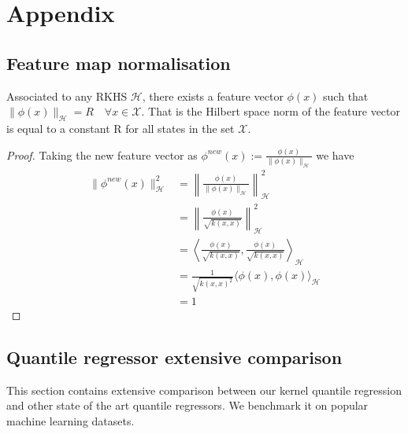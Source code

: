 \chapter{Appendix}
\section{Feature map normalisation}\label{appendix:new_feature}

\begin{lemma}
    Associated to any RKHS $\mathcal{H}$, there exists a feature vector $\phi(x)$ such that $\|\phi(x)\|_{\mathcal{H}}=R \quad \forall x \in \mathcal{X}$.
    That is the Hilbert space norm of the feature vector is equal to a constant R for all states in the set $\mathcal{X}$.
\end{lemma}
\begin{proof}
    Taking the new feature vector as $\phi^{new} (x):=\frac{\phi(x)}{\|\phi(x)\|_{\mathcal{H}}}$ we have
\begin{align*}
    \|
    \phi^{new}(x)\|_{\mathcal{H}}^{2} &= \left\|\frac{\phi(x)}{\|\phi(x)\|_{\mathcal{H}}}
    \right\|_{\mathcal{H}}^{2}
    \\
    &=
    \left\|
    \frac{\phi(x)}
    {\sqrt{k(x,x)}}
    \right\|_{\mathcal{H}}^{2}
    \\
    &=
    \left\langle
    \frac{\phi(x)}
    {\sqrt{k(x,x)}}
    ,
    \frac{\phi(x)}
    {\sqrt{k(x,x)}}
    \right\rangle_{\mathcal{H}}
    \\
    &=
    \frac{1}{\sqrt{k(x,x)^{2}}}
    \langle
    \phi(x)
    ,
    \phi(x)
    \rangle_{\mathcal{H}}
    \\
    &=1
\end{align*}
\end{proof}



\section{Quantile regressor extensive comparison}\label{appendix:quantile_regressor_extensive_comparison}
This section contains extensive comparison between our kernel quantile regression and other state of the art quantile regressors. We benchmark it on popular machine learning datasets.
